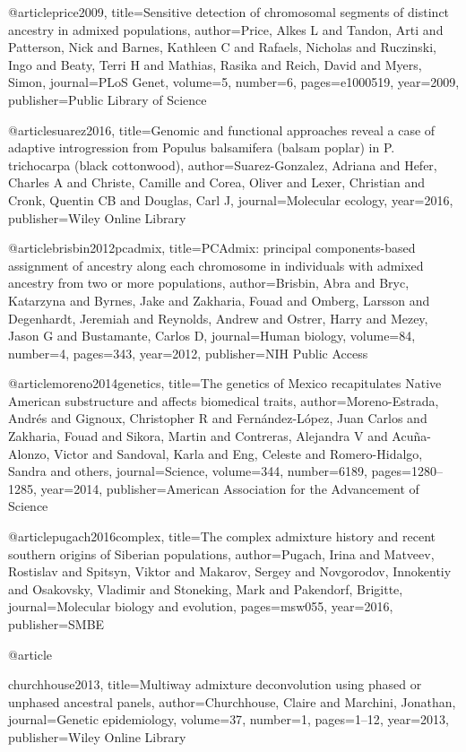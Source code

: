 @article{price2009,
  title={Sensitive detection of chromosomal segments of distinct ancestry in admixed populations},
  author={Price, Alkes L and Tandon, Arti and Patterson, Nick and Barnes, Kathleen C and Rafaels, Nicholas and Ruczinski, Ingo and Beaty, Terri H and Mathias, Rasika and Reich, David and Myers, Simon},
  journal={PLoS Genet},
  volume={5},
  number={6},
  pages={e1000519},
  year={2009},
  publisher={Public Library of Science}
}

@article{suarez2016,
  title={Genomic and functional approaches reveal a case of adaptive introgression from Populus balsamifera (balsam poplar) in P. trichocarpa (black cottonwood)},
  author={Suarez-Gonzalez, Adriana and Hefer, Charles A and Christe, Camille and Corea, Oliver and Lexer, Christian and Cronk, Quentin CB and Douglas, Carl J},
  journal={Molecular ecology},
  year={2016},
  publisher={Wiley Online Library}
}

@article{brisbin2012pcadmix,
  title={PCAdmix: principal components-based assignment of ancestry along each chromosome in individuals with admixed ancestry from two or more populations},
  author={Brisbin, Abra and Bryc, Katarzyna and Byrnes, Jake and Zakharia, Fouad and Omberg, Larsson and Degenhardt, Jeremiah and Reynolds, Andrew and Ostrer, Harry and Mezey, Jason G and Bustamante, Carlos D},
  journal={Human biology},
  volume={84},
  number={4},
  pages={343},
  year={2012},
  publisher={NIH Public Access}
}

@article{moreno2014genetics,
  title={The genetics of Mexico recapitulates Native American substructure and affects biomedical traits},
  author={Moreno-Estrada, Andr{\'e}s and Gignoux, Christopher R and Fern{\'a}ndez-L{\'o}pez, Juan Carlos and Zakharia, Fouad and Sikora, Martin and Contreras, Alejandra V and Acu{\~n}a-Alonzo, Victor and Sandoval, Karla and Eng, Celeste and Romero-Hidalgo, Sandra and others},
  journal={Science},
  volume={344},
  number={6189},
  pages={1280--1285},
  year={2014},
  publisher={American Association for the Advancement of Science}
}

@article{pugach2016complex,
  title={The complex admixture history and recent southern origins of Siberian populations},
  author={Pugach, Irina and Matveev, Rostislav and Spitsyn, Viktor and Makarov, Sergey and Novgorodov, Innokentiy and Osakovsky, Vladimir and Stoneking, Mark and Pakendorf, Brigitte},
  journal={Molecular biology and evolution},
  pages={msw055},
  year={2016},
  publisher={SMBE}
}

@article{churchhouse2013,
  title={Multiway admixture deconvolution using phased or unphased ancestral panels},
  author={Churchhouse, Claire and Marchini, Jonathan},
  journal={Genetic epidemiology},
  volume={37},
  number={1},
  pages={1--12},
  year={2013},
  publisher={Wiley Online Library}

}

